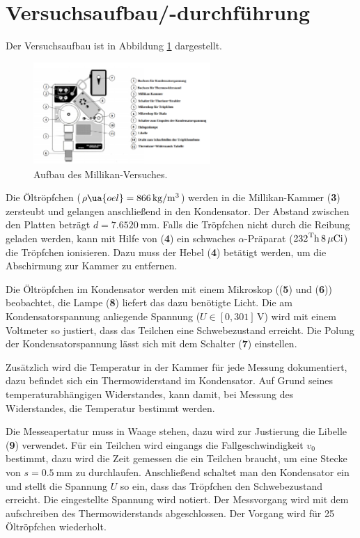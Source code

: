 \section{Versuchsaufbau/-durchführung}

Der Versuchsaufbau ist in Abbildung \ref{fig: versuchsaufabu} dargestellt.
\begin{figure}
  \centering
  \includegraphics[width=0.6\textwidth]{pics/aufbau.png}
  \caption{Aufbau des Millikan-Versuches\cite{anleitung503}.}
  \label{fig: versuchsaufabu}
  \end{figure}
Die Öltröpfchen ($\rho\ua{oel}=\SI{866}{\kilogram\per\cubic\meter}$) werden in die Millikan-Kammer (\textbf{3}) zersteubt
und gelangen anschließend in den Kondensator. Der Abstand zwischen den Platten beträgt $d=\SI{7.6520}{\milli\meter}$.
Falls die Tröpfchen nicht durch die
Reibung geladen werden, kann mit Hilfe von (\textbf{4}) ein schwaches
$\alpha$-Präparat ($\ce{{232}^Th}\,8\,\mu\ce{Ci}$) die Tröpfchen ionisieren. Dazu
muss der Hebel (\textbf{4}) betätigt werden, um die Abschirmung zur Kammer
zu entfernen.

Die Öltröpfchen im Kondensator werden mit einem Mikroskop ((\textbf{5}) und (\textbf{6})) beobachtet,
die Lampe (\textbf{8}) liefert das dazu benötigte Licht.
Die am Kondensatorspannung anliegende Spannung ($U\in\left[0,301\right]\,\si{\volt}$)
wird mit einem Voltmeter so justiert, dass das Teilchen eine Schwebezustand erreicht.
Die Polung der Kondensatorspannung lässt sich mit dem Schalter (\textbf{7}) einstellen.

Zusätzlich wird die Temperatur in der Kammer für jede Messung dokumentiert, dazu befindet sich
ein Thermowiderstand im Kondensator. Auf Grund seines temperaturabhängigen Widerstandes, kann
damit, bei Messung des Widerstandes, die Temperatur bestimmt werden.

Die Messeapertatur muss in Waage stehen, dazu wird zur Justierung die
Libelle (\textbf{9}) verwendet.
Für ein Teilchen wird eingangs die Fallgeschwindigkeit $v_0$ bestimmt, dazu
wird die Zeit gemessen die ein Teilchen braucht, um eine Stecke von $s=\SI{0.5}{\milli\meter}$
zu durchlaufen. Anschließend schaltet man den Kondensator ein und stellt die Spannung
$U$ so ein, dass das Tröpfchen den Schwebezustand erreicht. Die eingestellte
Spannung wird notiert. Der Messvorgang wird mit dem aufschreiben des Thermowiderstands
abgeschlossen. Der Vorgang wird für 25 Öltröpfchen wiederholt.
